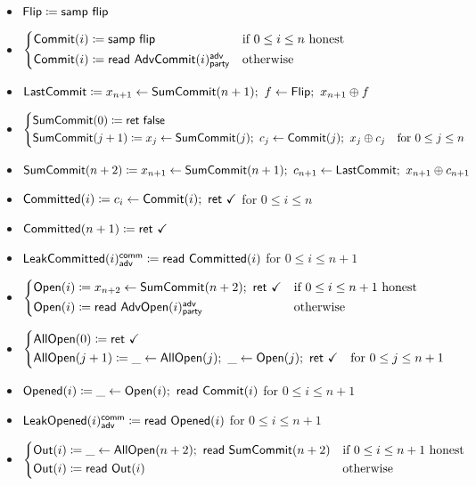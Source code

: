 \begin{itemize}
\item $\mathsf{Flip} \coloneqq \mathsf{samp} \ \mathsf{flip}$
\item {\color{blue} $\begin{cases*} \Commit(i) \coloneqq \samp{\flip} & \text{if $0 \leq i \leq n$ honest} \\ \Commit(i) \coloneqq \read{\AdvCommit(i)^\adv_\party} & \text{otherwise} \end{cases*}$}
\item {\color{blue} $\mathsf{LastCommit} \coloneqq x_{n+1} \leftarrow \mathsf{SumCommit}(n+1); \ f \leftarrow \mathsf{Flip}; \ x_{n+1} \oplus f$}
\item {\color{blue} $\begin{cases*} \SumCommit(0) \coloneqq \ret{\false} & \\ \SumCommit(j+1) \coloneqq x_j \leftarrow \SumCommit(j); \ c_j \leftarrow \Commit(j); \ x_j \oplus c_j & \text{for $0 \leq j \leq n$} \end{cases*}$}
\item {\color{blue} $\SumCommit(n+2) \coloneqq x_{n+1} \leftarrow \SumCommit(n+1); \ c_{n+1} \leftarrow \LastCommit; \ x_{n+1} \oplus c_{n+1}$}
\item {\color{magenta} $\mathsf{Committed}(i) \coloneqq c_i \leftarrow \mathsf{Commit}(i); \ \mathsf{ret} \ \checkmark$ for $0 \leq i \leq n$}
\item {\color{magenta} $\mathsf{Committed}(n+1) \coloneqq \mathsf{ret} \ \checkmark$}
\item {\color{magenta} $\mathsf{LeakCommitted}(i)^{\mathsf{comm}}_{\mathsf{adv}} \coloneqq \mathsf{read} \ \mathsf{Committed}(i)$ for $0 \leq i \leq n+1$}
\item {\color{teal} $\begin{cases*} \Open(i) \coloneqq x_{n+2} \leftarrow \SumCommit(n+2); \ \ret{\checkmark} & \text{if $0 \leq i \leq n+1$ honest} \\ \Open(i) \coloneqq \read{\AdvOpen(i)^\adv_\party} & \text{otherwise} \end{cases*}$}
\item {\color{teal} $\begin{cases*} \AllOpen(0) \coloneqq \ret{\checkmark} & \\ \AllOpen(j+1) \coloneqq \_ \leftarrow \AllOpen(j); \ \_ \leftarrow \Open(j); \ \ret{\checkmark} & \text{for $0 \leq j \leq n+1$} \end{cases*}$}
\item {\color{red} $\mathsf{Opened}(i) \coloneqq \_ \leftarrow \mathsf{Open}(i); \ \mathsf{read} \ \mathsf{Commit}(i)$ for $0 \leq i \leq n+1$}
\item {\color{red} $\mathsf{LeakOpened}(i)^{\mathsf{comm}}_{\mathsf{adv}} \coloneqq \mathsf{read} \ \mathsf{Opened}(i)$ for $0 \leq i \leq n+1$}
\item $\begin{cases*} \Out(i) \coloneqq \_ \leftarrow \AllOpen(n+2); \ \read{\SumCommit(n+2)} & \text{if $0 \leq i \leq n+1$ honest} \\ \Out(i) \coloneqq \read{\Out(i)} & \text{otherwise} \end{cases*}$
\end{itemize}

